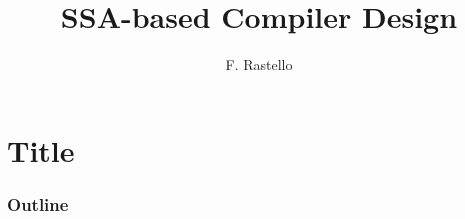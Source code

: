 \documentclass{beamer}
\begin{document}
\newcommand{\before}{\prec_{\mbox{\scriptsize seq}}}
\newcommand{\violet}[1]{{\color{violet}{#1}}}
\newcommand{\red}[1]{{\color{red}{#1}}}
\newcommand{\blue}[1]{{\color{blue}{#1}}}
\newcommand{\green}[1]{{\color{green2}{#1}}}
\newcommand{\gray}[1]{{\color{gray}{#1}}}
\newcommand{\mysmiley}{\Large \color{red}{\smiley}}
\newcommand{\sad}{\texttt{[image: fig/flag-smiley-sad.png]}}
\def\Va{\only<0>{a}\only<1>{\red{a}}\only<2->{\red{\ad}}}
\def\Vd{\only<0>{d}\only<1>{\red{d}}\only<2->{\red{\ad}}}
\def\move{\texttt{MOVE}}
\def\ad{a\hspace{-0.2em}d}
\newcommand{\gr}[1]{{greedy-$#1$-colorable}}
\newcommand{\Gr}[1]{{Greedy-$#1$-colorable}}
\renewcommand{\emph}[1]{{\usebeamercolor[fg]{titlelike}#1}}



\title[SSA-based Compiler Design]{SSA-based Compiler Design}
\author[F. Rastello]{F. Rastello\inst{*}}

\date[CRI'13]{}



\section*{Title}
\mymaketitle

\begin{frame}
  \frametitle{Outline}
  \tableofcontents%
\end{frame}






\end{document}
